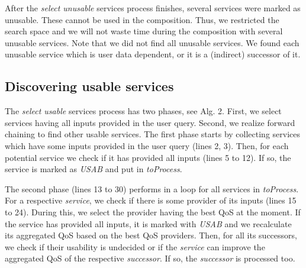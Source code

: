 \documentclass[11pt]{llncs}
\begin{document}
After the \emph{select unusable} services process finishes, several services were marked
as unusable. These cannot be used in the composition. Thus, we restricted the search
space and we will not waste time during the composition with several unusable
services. Note that we did not find all unusable services. We found each unusable
service which is user data dependent, or it is a (indirect) successor of it.

\subsection{Discovering usable services}

The \emph{select usable} services process has two phases, see Alg. 2. First, we select services
having all inputs provided in the user query. Second, we realize forward chaining
to find other usable services. The first phase starts by collecting services which
have some inputs provided in the user query (lines 2, 3). Then, for each potential
service we check if it has provided all inputs (lines 5 to 12). If so, the service is
marked as \emph{USAB} and put in \emph{toProcess}.

The second phase (lines 13 to 30) performs in a loop for all services in \emph{toProcess}.
For a respective \emph{service}, we check if there is some provider of its inputs (lines 15
to 24). During this, we select the provider having the best QoS at the moment. If
the service has provided all inputs, it is marked with \emph{USAB} and we recalculate its
aggregated QoS based on the best QoS providers. Then, for all its successors, we
check if their usability is undecided or if the \emph{service} can improve the aggregated
QoS of the respective \emph{successor}. If so, the \emph{successor} is processed too.
\end{document}
